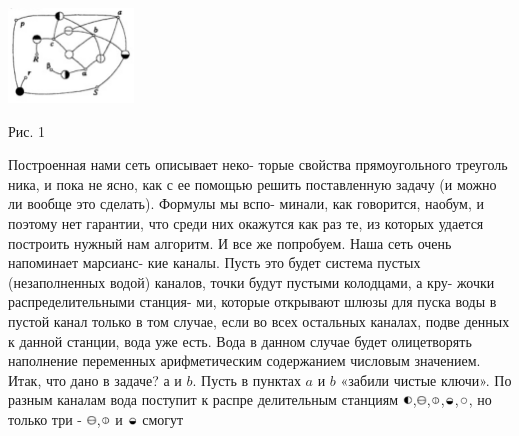 \documentclass[a4paper]{article}
\begin{document}
\begin{multicols}{3}
\begin{center}\includegraphics[width=0.25\textwidth]{многокруов} \end{center}
\begin{flushleft}Рис. 1\end{flushleft}

Построенная нами сеть описывает неко- торые свойства прямоугольного треуголь
ника, и пока не ясно, как с ее помощью
решить поставленную задачу (и можно ли вообще это сделать). Формулы мы вспо- минали, как говорится, наобум, и поэтому нет гарантии, что среди них окажутся как раз те, из которых удается построить
нужный нам алгоритм. И все же попробуем. Наша сеть очень напоминает марсианс- кие каналы. Пусть это будет система пустых (незаполненных водой) каналов,
%
точки будут пустыми колодцами, а кру- жочки распределительными станция- ми, которые открывают шлюзы для пуска воды в пустой канал только в том случае,
если во всех остальных каналах, подве денных к данной станции, вода уже есть. Вода в данном случае будет олицетворять наполнение переменных арифметическим содержанием числовым значением.
Итак, что дано в задаче? $а$ и $b$. Пусть в пунктах $a$ и $b$ «забили чистые ключи». По разным каналам вода поступит к распре
делительным станциям \includegraphics[width=0.02\textwidth]{круг5},\includegraphics[width=0.02\textwidth]{круг2},\includegraphics[width=0.02\textwidth]{круг1},\includegraphics[width=0.02\textwidth]{круг6},\includegraphics[width=0.02\textwidth]{круг}, но только три - \includegraphics[width=0.02\textwidth]{круг2},\includegraphics[width=0.02\textwidth]{круг1} и \includegraphics[width=0.02\textwidth]{круг6} смогут

\end{multicols}
\end{document}
